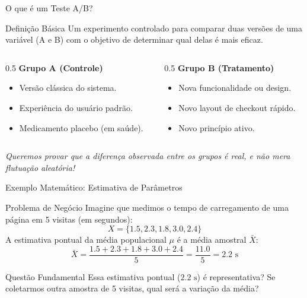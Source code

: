 \begin{frame}{O que é um Teste A/B?}
    \begin{block}{Definição Básica}
        Um experimento controlado para comparar duas versões de uma variável (A e B) com o objetivo de determinar qual delas é mais eficaz.
    \end{block}
    
    \begin{columns}
        \begin{column}{0.5\textwidth}
            \textbf{Grupo A (Controle)}
            \begin{itemize}
                \item Versão clássica do sistema.
                \item Experiência do usuário padrão.
                \item Medicamento placebo (em saúde).
            \end{itemize}
        \end{column}
        \begin{column}{0.5\textwidth}
            \textbf{Grupo B (Tratamento)}
            \begin{itemize}
                \item Nova funcionalidade ou design.
                \item Novo layout de checkout rápido.
                \item Novo princípio ativo.
            \end{itemize}
        \end{column}
    \end{columns}
    
    \vspace{0.4cm}
    \centering
    \textit{Queremos provar que a diferença observada entre os grupos é real, e não mera flutuação aleatória!}
\end{frame}

\begin{frame}{Exemplo Matemático: Estimativa de Parâmetros}
    \begin{block}{Problema de Negócio}
        Imagine que medimos o tempo de carregamento de uma página em 5 visitas (em segundos):
        $$X = \{1.5, 2.3, 1.8, 3.0, 2.4\}$$
        A estimativa pontual da média populacional $\mu$ é a média amostral $\bar{X}$:
        $$\bar{X} = \frac{1.5 + 2.3 + 1.8 + 3.0 + 2.4}{5} = \frac{11.0}{5} = 2.2\text{ s}$$
    \end{block}
    \begin{block}{Questão Fundamental}
        Essa estimativa pontual ($2.2\text{ s}$) é representativa? Se coletarmos outra amostra de 5 visitas, qual será a variação da média?
    \end{block}
\end{frame}


